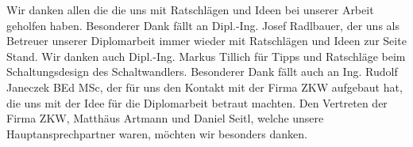 \begin{acknowledgements}
	\begin{center}
    Wir danken allen die die uns mit Ratschlägen und Ideen bei unserer Arbeit geholfen haben. Besonderer Dank fällt an Dipl.-Ing. Josef Radlbauer, der uns als Betreuer unserer Diplomarbeit immer wieder mit Ratschlägen und Ideen zur Seite Stand. Wir danken auch Dipl.-Ing. Markus Tillich für Tipps und Ratschläge beim Schaltungsdesign des Schaltwandlers. Besonderer Dank fällt auch an Ing. Rudolf Janeczek BEd MSc, der für uns den Kontakt mit der Firma ZKW aufgebaut hat, die uns mit der Idee für die Diplomarbeit betraut machten. Den Vertreten der Firma ZKW, Matthäus Artmann und Daniel Seitl, welche unsere Hauptansprechpartner waren, möchten wir besonders danken. 
	\end{center}
\end{acknowledgements}
